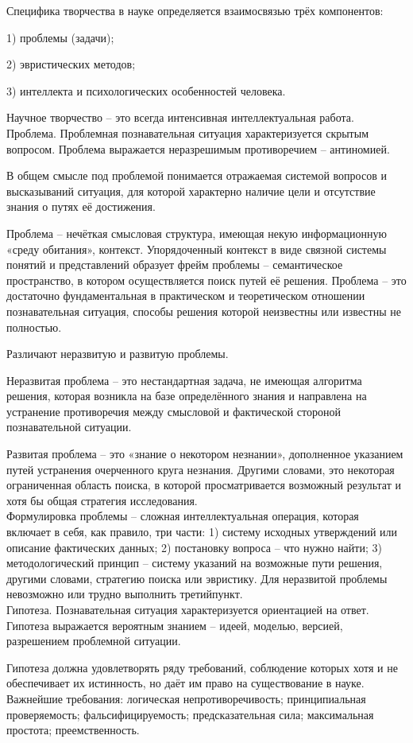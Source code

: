 \documentclass[exam_answers.tex]{subfiles}
\begin{document}
\renewcommand{\baselinestretch}{0.75}

Специфика творчества в науке определяется взаимосвязью трёх компонентов:

1) проблемы (задачи);

2) эвристических методов;

3) интеллекта и психологических особенностей человека.

Научное творчество – это всегда интенсивная интеллектуальная работа.
\\

Проблема. Проблемная познавательная ситуация характеризуется скрытым вопросом. Проблема выражается неразрешимым противоречием – антиномией.

В общем смысле под проблемой понимается отражаемая системой вопросов и высказываний ситуация, для которой характерно наличие цели и отсутствие знания о путях её достижения.

Проблема – нечёткая смысловая структура, имеющая некую информационную «среду обитания», контекст.
Упорядоченный контекст в виде связной системы понятий и представлений образует фрейм проблемы – семантическое пространство, в котором осуществляется поиск путей её решения.
Проблема – это достаточно фундаментальная в практическом и теоретическом отношении познавательная ситуация, способы решения которой неизвестны или известны не полностью.

Различают неразвитую и развитую проблемы.

Неразвитая проблема – это нестандартная задача, не имеющая алгоритма решения, которая возникла на базе определённого знания и направлена на устранение противоречия между смысловой и фактической стороной познавательной ситуации.

Развитая проблема – это «знание о некотором незнании», дополненное указанием путей устранения очерченного круга незнания.
Другими словами, это некоторая ограниченная область поиска, в которой просматривается возможный результат и хотя бы общая стратегия исследования.
\\

Формулировка проблемы – сложная интеллектуальная операция, которая включает в себя, как правило, три части:
1) систему исходных утверждений или описание фактических данных;
2) постановку вопроса – что нужно найти;
3) методологический принцип – систему указаний на возможные пути решения, другими словами, стратегию поиска или эвристику. Для неразвитой проблемы невозможно или трудно выполнить третийпункт.
\\

Гипотеза.
Познавательная ситуация характеризуется ориентацией на ответ.
Гипотеза выражается вероятным знанием – идеей, моделью, версией, разрешением проблемной ситуации.

Гипотеза должна удовлетворять ряду требований, соблюдение которых хотя и не обеспечивает их истинность, но даёт им право на существование в науке.
Важнейшие требования: логическая непротиворечивость; принципиальная проверяемость; фальсифицируемость; предсказательная сила; максимальная простота; преемственность.
\end{document}
